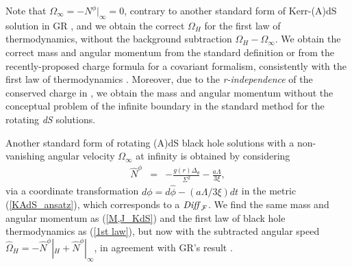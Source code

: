 \documentclass[preprint,aps,tightenlines,showkeys,nofootinbib,superscriptaddress]{revtex4}
\newcommand{\beq}{\begin{eqnarray}}
\newcommand{\eeq}{\end{eqnarray}}
\newcommand{\De}{\Delta}
\newcommand{\La}{{\Lambda}}
\newcommand{\Si}{{\Sigma}}
\newcommand{\Om}{{\Omega}}
\newcommand{\f}{\frac}
\newcommand{\DiffF}{${\it Diff}_{\cal F}$}
\begin{document}
Note that $\Om_{\infty}=-N^{\phi}|_{\infty}=0$, contrary to another standard form of Kerr-(A)dS solution in GR \cite{Cart:1973,Gibb:1977,Hawk:1998,Henn:1985}, and we obtain the correct $\Om_H$ for the first law of thermodynamics, without the background subtraction $\Om_H-\Om_{\infty}$. We obtain the correct mass and angular momentum from the standard definition or from the recently-proposed charge formula for a covariant formalism, consistently with the first law of thermodynamics \cite{Cald:1999,Gibb:2004b}. Moreover, due to the {\it r-independence} of the conserved charge
in \cite{Deve:2021}, we obtain the mass and angular momentum without the conceptual problem of the infinite boundary in the standard method for the rotating {\it dS} solutions.

Another standard form of rotating (A)dS black hole solutions with a non-vanishing angular velocity $\Om_{\infty}$ at infinity \cite{Cart:1973,Gibb:1977,Henn:1985,Hawk:1998,Cald:1999} is obtained by considering
\beq
\widehat{N}^{\phi}&=&-\f{g(r) \De_{\theta} }{\Si^2}-\f{a \La}{3 \xi},
\eeq
via a coordinate transformation $d \phi=d \widehat{\phi}-(a \La/3 \xi)dt$ in
the metric (\ref{KAdS_ansatz}), which
corresponds to a \DiffF \cite{Cart:1973,Henn:1985,Park:2023}.
We find the same mass and angular momentum as (\ref{M,J_KdS}) and the first law of black hole thermodynamics as (\ref{1st law}), but now with the subtracted angular speed $\widehat{\Om}_{H}=-\widehat{N}^{\phi}|_H+\widehat{N}^{\phi}|_{\infty}$, in agreement with GR's result \cite{Hawk:1998,Henn:1985}.
\end{document}

